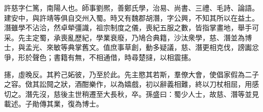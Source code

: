 
\begin{pinyinscope}
許慈字仁篤，南陽人也。師事劉熈，善鄭氏學，治易、尚書、三禮、毛詩、論語。建安中，與許靖等俱自交州入蜀。時又有魏郡胡潛，字公興，不知其所以在益土。潛雖學不沾洽，然卓犖彊識，祖宗制度之儀，喪紀五服之數，皆指掌畫地，舉手可采。先主定蜀，承喪亂歷紀，學業衰廢，乃鳩合典籍，沙汰衆學，慈、潛並為博士，與孟光、來敏等典掌舊文。值庶事草創，動多疑議，慈、潛更相克伐，謗讟忿爭，形於聲色；書籍有無，不相通借，時尋楚撻，以相震攇。

攇，虛晚反。其矜己妬彼，乃至於此。先主愍其若斯，羣僚大會，使倡家假為二子之容。傚其訟䦧之狀，酒酣樂作，以為嬉戲，初以辭義相難，終以刀杖相屈，用感切之。潛先沒，慈後主世稍遷至大長秋，卒。孫盛曰：蜀少人士，故慈、潛等並見載述。子勛傳其業，復為博士。


\end{pinyinscope}